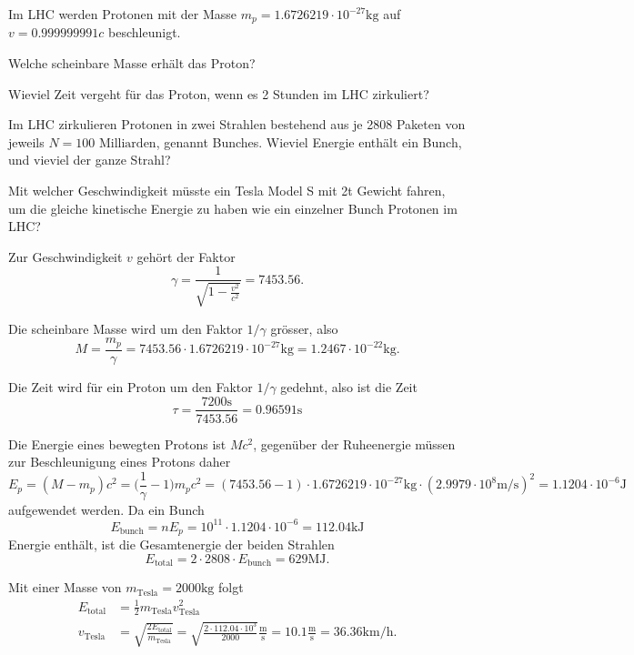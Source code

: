Im LHC werden Protonen mit der Masse $m_p=1.6726219\cdot 10^{-27}\text{kg}$
auf $v=0.999999991c$ beschleunigt.
\begin{teilaufgaben}
\item Welche scheinbare Masse erhält das Proton?
\item Wieviel Zeit vergeht für das Proton, wenn es 2 Stunden im LHC
zirkuliert?
\item Im LHC zirkulieren Protonen in zwei Strahlen bestehend aus je
2808 Paketen von jeweils $N=100\text{ Milliarden}$, genannt Bunches.
Wieviel Energie enthält ein Bunch, und vieviel der ganze Strahl?
\item Mit welcher Geschwindigkeit müsste ein Tesla Model S mit 2t Gewicht
fahren, um die gleiche kinetische Energie zu haben wie ein einzelner Bunch
Protonen im LHC?
\end{teilaufgaben}

\begin{loesung}
Zur Geschwindigkeit  $v$ gehört der Faktor
\[
\gamma
=
\frac1{\displaystyle\sqrt{1-\frac{v^2}{c^2}}}
=
7453.56.
\]
\begin{teilaufgaben}
\item Die scheinbare Masse wird um den Faktor $1/\gamma$ grösser, also
\[
M
=
\frac{m_p}{\gamma}
=
7453.56
\cdot
1.6726219\cdot 10^{-27}\text{kg}
=
1.2467\cdot 10^{-22}\text{kg}.
\]
\item Die Zeit wird für ein Proton um den Faktor $1/\gamma$ gedehnt,
also ist die Zeit 
\[
\tau = \frac{7200\text{s}}{7453.56}=0.96591\text{s}
\]
\item 
Die Energie eines bewegten Protons ist $Mc^2$, gegenüber der
Ruheenergie müssen zur Beschleunigung eines Protons daher
\[
E_p
=
(M-m_p)c^2 
=
\biggl(\frac{1}{\gamma}-1\biggr)m_pc^2
=
(7453.56-1)\cdot
1.6726219\cdot 10^{-27}\text{kg}
\cdot
(2.9979\cdot 10^{8}\text{m/s})^2
=
1.1204\cdot 10^{-6}\text{J}
\]
aufgewendet werden.
Da ein Bunch 
\[
E_{\text{bunch}}
=
nE_p
=
10^{11}\cdot1.1204\cdot 10^{-6}
=
112.04\text{kJ}
\]
Energie enthält, ist die Gesamtenergie der beiden Strahlen
\[
E_{\text{total}}
=
2\cdot 2808\cdot E_{\text{bunch}}
=
629\text{MJ}.
\]
\item
Mit einer Masse von $m_{\text{Tesla}}=2000\text{kg}$ folgt
\begin{align*}
E_{\text{total}}
&=
\frac12m_{\text{Tesla}}v_{\text{Tesla}}^2
\\
v_{\text{Tesla}}
&=\sqrt{
\frac{2E_{\text{total}}}{m_{\text{Tesla}}}
}
=
\sqrt{\frac{2\cdot 112.04\cdot 10^3}{2000}}\frac{\text{m}}{\text{s}}
=
10.1\frac{\text{m}}{\text{s}}=36.36\text{km/h}.
\end{align*}
\end{teilaufgaben}
\end{loesung}





